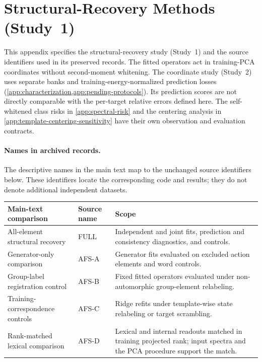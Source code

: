 \section{Structural-Recovery Methods (Study~1)}
\label{app:methods}

This appendix specifies the structural-recovery study (Study~1)
and the source identifiers used in its preserved records.
The fitted operators act in training-PCA coordinates without
second-moment whitening.
The coordinate study (Study~2) uses separate banks and
training-energy-normalized prediction losses
(\cref{app:characterization,app:pending-protocols}).
Its prediction scores are not directly comparable with the
per-target relative errors defined here.
The self-whitened class risks in \cref{app:spectral-risk} and
the centering analysis in
\cref{app:template-centering-sensitivity} have their own
observation and evaluation contracts.

\paragraph{Names in archived records.}
The descriptive names in the main text map to the unchanged
source identifiers below.
These identifiers locate the corresponding code and results;
they do not denote additional independent datasets.
\begin{center}
\small
\begin{tabular}{@{}p{}p{}p{}@{}}
\toprule
Main-text comparison & Source name & Scope \\
\midrule
All-element structural recovery
& FULL
& Independent and joint fits, prediction and consistency
  diagnostics, and controls. \\
Generator-only comparison
& AFS-A
& Generator fits evaluated on excluded action elements
  and word controls. \\
Group-label registration control
& AFS-B
& Fixed fitted operators evaluated under non-automorphic
  group-element relabeling. \\
Training-correspondence controls
& AFS-C
& Ridge refits under template-wise state relabeling
  or target scrambling. \\
Rank-matched lexical comparison
& AFS-D
& Lexical and internal readouts matched in training projected
  rank; input spectra and the PCA procedure support the match. \\
\bottomrule
\end{tabular}
\end{center}

